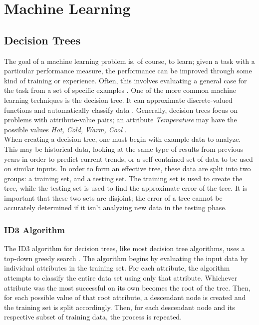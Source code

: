 \chapter{Machine Learning}
\section{Decision Trees}
The goal of a machine learning problem is, of course, to learn; given a task with a particular performance measure, the performance can be improved through some kind of training or experience. Often, this involves evaluating a general case for the task from a set of specific examples \cite{mitc97}. One of the more common machine learning techniques is the decision tree. It can approximate discrete-valued functions \cite{mitc97} and automatically classify data \cite{sega07}. Generally, decision trees focus on problems with attribute-value pairs; an attribute \textit{Temperature} may have the possible values \textit{Hot, Cold, Warm, Cool} \cite{mitc97}.\\

When creating a decision tree, one must begin with example data to analyze. This may be historical data, looking at the same type of results from previous years in order to predict current trends, or a self-contained set of data to be used on similar inputs. In order to form an effective tree, these data are split into two groups: a training set, and a testing set. The training set is used to create the tree, while the testing set is used to find the approximate error of the tree. It is important that these two sets are disjoint; the error of a tree cannot be accurately determined if it isn't analyzing new data in the testing phase.

\subsection{ID3 Algorithm}
The ID3 algorithm for decision trees, like most decision tree algorithms, uses a top-down greedy search \cite{mitc97}. The algorithm begins by evaluating the input data by individual attributes in the training set. For each attribute, the algorithm attempts to classify the entire data set using only that attribute. Whichever attribute was the most successful on its own becomes the root of the tree. Then, for each possible value of that root attribute, a descendant node is created and the training set is split accordingly. Then, for each descendant node and its respective subset of training data, the process is repeated.\\

